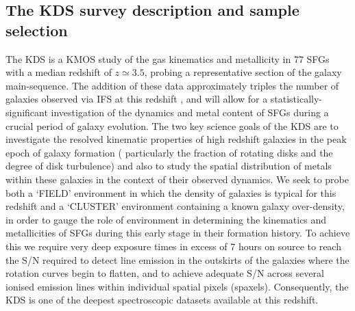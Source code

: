 \documentclass[fleqn,usenatbib]{mn2e}
\begin{document}
\subsection{The KDS survey description and sample selection}\label{subsec:survey_intro}
The KDS is a KMOS study of the gas kinematics and metallicity in 77 SFGs with a median redshift of $z\simeq3.5$, probing a representative section of the galaxy main-sequence.
The addition of these data approximately triples the number of galaxies observed via IFS at this redshift \citep{Cresci2010,Lemoine-Busserolle2010,Gnerucci2011}, and will allow for a statistically-significant investigation of the dynamics and metal content of SFGs during a crucial period of galaxy evolution. 
The two key science goals of the KDS are to investigate the resolved kinematic properties of high redshift galaxies in the peak epoch of galaxy formation ( particularly the fraction of rotating disks and the degree of disk turbulence) and also to study the spatial distribution of metals within these galaxies in the context of their observed dynamics.
We seek to probe both a `FIELD' environment in which the density of galaxies is typical for this redshift and a `CLUSTER' environment containing a known galaxy over-density, in order to gauge the role of environment in determining the kinematics and metallicities of SFGs during this early stage in their formation history.
To achieve this we require very deep exposure times in excess of 7 hours on source to reach the S/N required to detect line emission in the outskirts of the galaxies where the rotation curves begin to flatten, and to achieve adequate S/N across several ionised emission lines within individual spatial pixels (spaxels).
Consequently, the KDS is one of the deepest spectroscopic datasets available at this redshift. 
\end{document}
